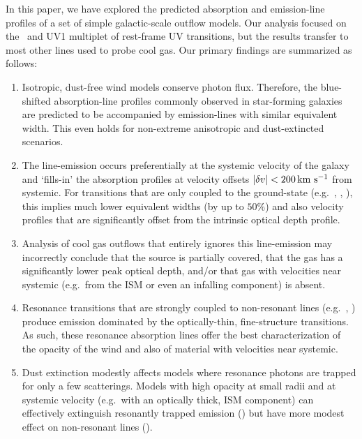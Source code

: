 \documentclass[12pt,preprint]{aastex}
\begin{document}
In this paper, we have explored the predicted absorption and
emission-line profiles of a set of simple galactic-scale outflow
models.  Our analysis focused on the \mgiid\ and  UV1
multiplet of rest-frame UV transitions, but the results transfer to
most other lines used to probe cool gas.  Our primary
findings are summarized as follows:

\begin{enumerate}

\item Isotropic, dust-free wind models conserve photon flux.
  Therefore, the blue-shifted absorption-line profiles commonly
  observed in star-forming galaxies are predicted to be accompanied by
  emission-lines with similar equivalent width.  This even holds for
  non-extreme anisotropic and dust-extincted scenarios.

\item The line-emission occurs preferentially at the systemic velocity
  of the galaxy and `fills-in' the absorption profiles at velocity
  offsets $|\delta v| < 200 \, {\rm km~s^{-1}}$ from systemic.  For transitions that
  are only coupled to the ground-state (e.g.\ , \lya,
  ),  this implies much lower equivalent widths (by up to
  $50\%$) and also velocity profiles that are significantly offset
  from the intrinsic optical depth profile.

\item Analysis of cool gas outflows that entirely ignores this
line-emission may incorrectly conclude that the source is partially
covered, that the gas has a significantly lower peak optical depth, and/or that 
gas with velocities near systemic (e.g.\ from the ISM or even
an infalling component) is absent.   


\item Resonance transitions that are strongly coupled to
non-resonant lines (e.g.\ , ) 
produce emission dominated by the
optically-thin, fine-structure transitions.  As such, these resonance
absorption lines offer the best
characterization of the opacity of the wind and also of material 
with velocities near systemic.  

\item  Dust extinction modestly affects 
  models where resonance photons are trapped for only a few scatterings.  Models
  with high opacity at small radii and at systemic velocity (e.g.\
  with an
  optically thick, ISM component)  can effectively extinguish
  resonantly trapped emission () but have more modest
  effect on non-resonant lines (\feiis).


\end{enumerate}
\end{document}
